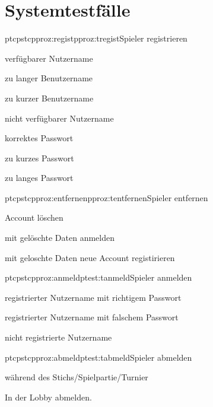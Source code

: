 \chapter{Systemtestfälle}

\setcounter{ptc}{10} %
\setcounter{pstc}{1} %

\begin{description}[leftmargin=3em, style=sameline]
	\begin{pftp}{ptc}{pstc}{pproz:regist}{pproz:tregist}{Spieler registrieren}
		\item verfügbarer Nutzername  
		\item zu langer Benutzername
		\item zu kurzer Benutzername
		\item nicht verfügbarer Nutzername
		\item korrektes Passwort
		\item zu kurzes Passwort
		\item zu langes Passwort
	\end{pftp}
	
	\begin{pftp}{ptc}{pstc}{pproz:entfernen}{pproz:tentfernen}{Spieler entfernen}
		\item	Account löschen
		\item   mit gelöschte Daten anmelden
		\item	mit geloschte Daten neue Account registirieren
	\end{pftp}
		
	\begin{pftp}{ptc}{pstc}{pproz:anmeld}{ptest:tanmeld}{Spieler anmelden}
		\item registrierter Nutzername mit richtigem Passwort
		\item registrierter Nutzername mit falschem Passwort
		\item nicht registrierte Nutzername
	\end{pftp}
	
	\begin{pftp}{ptc}{pstc}{pproz:abmeld}{ptest:tabmeld}{Spieler abmelden}
		\item	während des Stichs/Spielpartie/Turnier
		\item	In der Lobby abmelden.
	\end{pftp}


\end{description}
